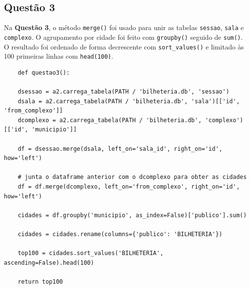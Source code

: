 \documentclass{article}
\begin{document}
\subsection*{Questão 3}
Na \textbf{Questão 3}, o método \texttt{merge()} foi usado para unir as tabelas \texttt{sessao}, \texttt{sala} e \texttt{complexo}. O agrupamento por cidade foi feito com \texttt{groupby()} seguido de \texttt{sum()}. O resultado foi ordenado de forma decrescente com \texttt{sort\_values()} e limitado às 100 primeiras linhas com \texttt{head(100)}.
\linespread{1}
\begin{lstlisting}
    def questao3():
    
    dsessao = a2.carrega_tabela(PATH / 'bilheteria.db', 'sessao')
    dsala = a2.carrega_tabela(PATH / 'bilheteria.db', 'sala')[['id', 'from_complexo']]
    dcomplexo = a2.carrega_tabela(PATH / 'bilheteria.db', 'complexo')[['id', 'municipio']]

    df = dsessao.merge(dsala, left_on='sala_id', right_on='id', how='left')

    # junta o dataframe anterior com o dcomplexo para obter as cidades
    df = df.merge(dcomplexo, left_on='from_complexo', right_on='id', how='left')

    cidades = df.groupby('municipio', as_index=False)['publico'].sum()

    cidades = cidades.rename(columns={'publico': 'BILHETERIA'})

    top100 = cidades.sort_values('BILHETERIA', ascending=False).head(100)

    return top100
\end{lstlisting}
\linespread{1.5}
\end{document}
